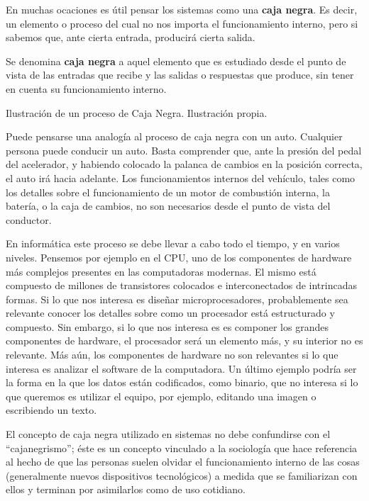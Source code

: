 En muchas ocaciones es útil pensar los sistemas como una \textbf{caja negra}. Es
decir, un elemento o proceso del cual no nos importa el funcionamiento interno,
pero si sabemos que, ante cierta entrada, producirá cierta salida.

\begin{definition}
    Se denomina \textbf{caja negra} a aquel elemento que es estudiado desde el
    punto de vista de las entradas que recibe y las salidas o respuestas que
    produce, sin tener en cuenta su funcionamiento interno.
\end{definition}

{Ilustración de un proceso de Caja Negra.} {Ilustración propia.}

Puede pensarse una analogía al proceso de caja negra con un auto. Cualquier
persona puede conducir un auto. Basta comprender que, ante la presión del pedal
del acelerador, y habiendo colocado la palanca de cambios en la posición
correcta, el auto irá hacia adelante. Los funcionamientos internos del vehículo,
tales como los detalles sobre el funcionamiento de un motor de combustión
interna, la batería, o la caja de cambios, no son necesarios desde el punto de
vista del conductor.

En informática este proceso se debe llevar a cabo todo el tiempo, y en varios
niveles. Pensemos por ejemplo en el CPU, uno de los componentes de hardware más
complejos presentes en las computadoras modernas. El mismo está compuesto de
millones de transistores colocados e interconectados de intrincadas formas. Si
lo que nos interesa es diseñar microprocesadores, probablemente sea relevante
conocer los detalles sobre como un procesador está estructurado y compuesto. Sin
embargo, si lo que nos interesa es es componer los grandes componentes de
hardware, el procesador será un elemento más, y su interior no es relevante. Más
aún, los componentes de hardware no son relevantes si lo que interesa es
analizar el software de la computadora. Un último ejemplo podría ser la forma en
la que los datos están codificados, como binario, que no interesa si lo que
queremos es utilizar el equipo, por ejemplo, editando una imagen o escribiendo
un texto.

El concepto de caja negra utilizado en sistemas no debe confundirse con el
``cajanegrismo''; éste es un concepto vinculado a la sociología que hace
referencia al hecho de que las personas suelen olvidar el funcionamiento interno
de las cosas (generalmente nuevos dispositivos tecnológicos) a medida que se
familiarizan con ellos y terminan por asimilarlos como de uso cotidiano.

